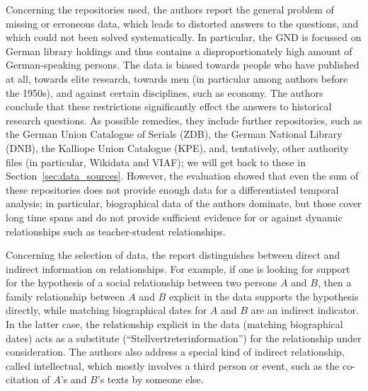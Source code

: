 Concerning the repositories used,
the authors report the general problem of missing or erroneous data,
which leads to distorted answers to the questions, and which could not been solved
systematically. In particular, the GND is focussed on German library holdings
and thus contains a disproportionately high amount of German-speaking persons.
The data is biased towards people who have published at all,
towards elite research, towards men (in particular among authors before the 1950s),
and against certain disciplines, such as economy.
The authors conclude that these restrictions significantly effect the answers to
historical research questions. As possible remedies, they include 
further repositories, such as 
the German Union Catalogue of Serials (ZDB),
the German National Library (DNB),
the Kalliope Union Catalogue (KPE),
and, tentatively, other authority files (in particular, Wikidata and VIAF);
we will get back to these in Section~\ref{sec:data_sources}.
However, the evaluation showed that even the sum of these repositories
does not provide enough data for a differentiated temporal
analysis; in particular, biographical data of the authors 
dominate, but those cover long time spans and do not provide sufficient evidence
for or against dynamic relationships such as teacher-student relationships.


Concerning the selection of data, the report distinguishes between
direct and indirect information on relationships.
For example, if one is looking for support for the hypothesis of a social relationship
between two persons $A$ and $B$, then a family relationship between $A$ and $B$ explicit in the data
supports the hypothesis directly, while matching biographical dates for $A$ and $B$
are an indirect indicator. In the latter case, the relationship
explicit in the data (matching biographical dates) acts as a substitute
(\enquote{Stellvertreterinformation}) for the relationship under consideration.
The authors also address a special kind of indirect relationship,
called intellectual, which mostly involves a third person
or event, such as the co-citation of $A$'s and $B$'s texts by someone else.

